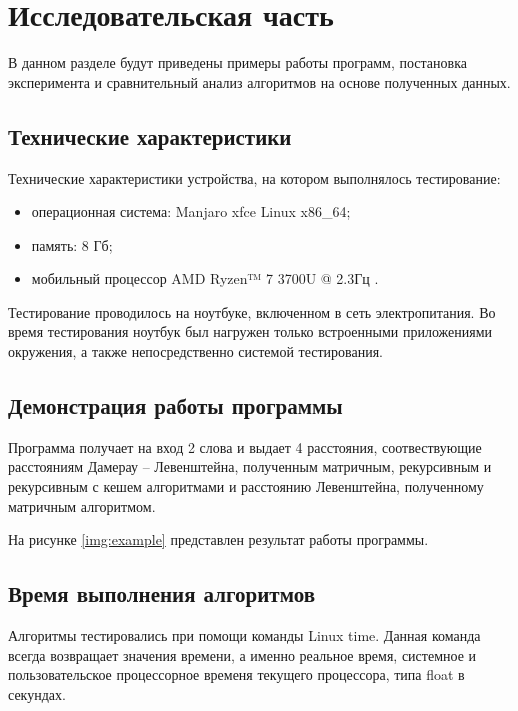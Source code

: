 \chapter{Исследовательская часть}

В данном разделе будут приведены примеры работы программ, постановка эксперимента и сравнительный анализ алгоритмов на основе полученных данных.

\section{Технические характеристики}

Технические характеристики устройства, на котором выполнялось тестирование:

\begin{itemize}
	\item операционная система: Manjaro xfce \cite{ubuntu} Linux \cite{linux} x86\_64;
	\item память: 8 Гб;
	\item мобильный процессор AMD Ryzen™ 7 3700U @ 2.3Гц \cite{intel}.
\end{itemize}

Тестирование проводилось на ноутбуке, включенном в сеть электропитания. Во время тестирования ноутбук был нагружен только встроенными приложениями окружения, а также непосредственно системой тестирования.

\section{Демонстрация работы программы}

Программа получает на вход 2 слова и выдает 4 расстояния, соотвествующие расстояниям Дамерау -- Левенштейна, полученным матричным, рекурсивным и рекурсивным с кешем алгоритмами и расстоянию Левенштейна, полученному матричным алгоритмом.

На рисунке \ref{img:example} представлен результат работы программы.


\FloatBarrier

\section{Время выполнения алгоритмов}

Алгоритмы тестировались при помощи команды Linux time. Данная команда всегда возвращает значения времени, а именно реальное время, системное и пользовательское процессорное временя текущего процессора, типа float в секундах.

